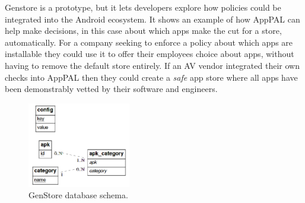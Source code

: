 \documentclass[thesis.tex]{subfiles}
\begin{document}
Genstore is a prototype, but it lets developers explore how policies could be
integrated into the Android ecosystem. It shows an example of how AppPAL can
help make decisions, in this case about which apps make the cut for a store,
automatically. For a company seeking to enforce a policy about which apps are
installable they could use it to offer their employees choice about apps,
without having to remove the default store entirely. If an AV vendor integrated
their own checks into AppPAL then they could create a \emph{safe} app
store where all apps have been demonstrably vetted by their software and
engineers.

\begin{figure}\centering
  \includegraphics[width=0.4\textwidth]{figures/genstore-schema.png}
  \caption{GenStore database schema.}
  \label{fig:genstore-schema}
\end{figure}

\end{document}
